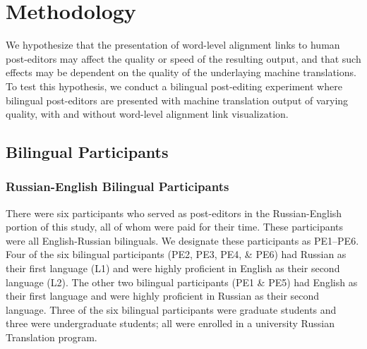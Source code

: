 
\section{Methodology}
\label{sec:methodology}

We hypothesize that the presentation of word-level alignment links to human post-editors may affect the quality or speed of the resulting output, and that such effects may be dependent on the quality of the underlaying machine translations.
%
To test this hypothesis, we conduct a bilingual post-editing experiment  where bilingual post-editors are presented with machine translation output of varying quality, with and without word-level alignment link visualization. 





\subsection{Bilingual Participants}


\subsubsection{Russian-English Bilingual Participants}
There were six participants who served as post-editors in the Russian-English portion of this study, all of whom were paid for their time.
%
These participants were all English-Russian bilinguals.
%
We designate these participants as PE1--PE6.
%
Four of the six bilingual participants (PE2, PE3, PE4, \& PE6) had Russian as their first language (L1) and were highly proficient in English as their second language (L2).
%
The other two bilingual participants (PE1 \& PE5) had English as their first language and were highly proficient in Russian as their second language.
%
Three of the six bilingual participants were graduate students and three were undergraduate students; all were enrolled in a university Russian Translation program. %

%

